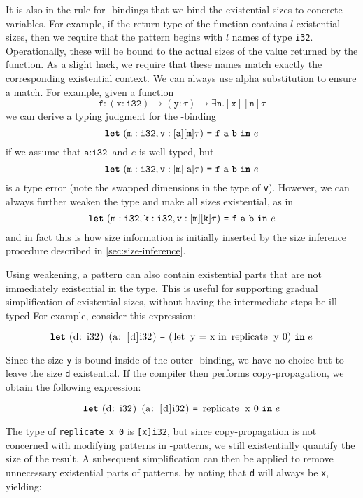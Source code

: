 It is also in the rule for -bindings that we bind the
existential sizes to concrete variables.  For example, if the return
type of the function contains $l$ existential sizes, then we require
that the pattern begins with $l$ names of type \texttt{i32}.
Operationally, these will be bound to the actual sizes of the value
returned by the function.  As a slight hack, we require that these
names match exactly the corresponding existential context.  We can
always use alpha substitution to ensure a match.  For example, given a
function
\[
  \texttt{f}: (\texttt{x}: \texttt{i32}) \rightarrow (\texttt{y}: \tau) \rightarrow \exists \texttt{n}.[\texttt{x}][\texttt{n}]\tau
\]
we can derive a typing judgment for the -binding
\[
\mbox{\texttt{\bfseries{let}}}~(\texttt{m}: \texttt{i32}, \texttt{v}: [\texttt{a}][\texttt{m}]\tau)~\mbox{\texttt{=}}~\texttt{f}~\texttt{a}~\texttt{b}~\mbox{\texttt{\bfseries{in}}}~e
\]
if we assume that $\texttt{a}: \texttt{i32}$ and $e$ is well-typed,
but
\[
\mbox{\texttt{\bfseries{let}}}~(\texttt{m}: \texttt{i32}, \texttt{v}: [\texttt{m}][\texttt{a}]\tau)~\mbox{\texttt{=}}~\texttt{f}~\texttt{a}~\texttt{b}~\mbox{\texttt{\bfseries{in}}}~e
\]
is a type error (note the swapped dimensions in the type of
\texttt{v}).  However, we can always further weaken the type and make
all sizes existential, as in
\[
\mbox{\texttt{\bfseries{let}}}~(\texttt{m}: \texttt{i32}, \texttt{k}: \texttt{i32}, \texttt{v}: [\texttt{m}][\texttt{k}]\tau)~\mbox{\texttt{=}}~\texttt{f}~\texttt{a}~\texttt{b}~\mbox{\texttt{\bfseries{in}}}~e
\]
and in fact this is how size information is initially inserted by the
size inference procedure described in \cref{sec:size-inference}.

Using weakening, a pattern can also contain existential parts that are
not immediately existential in the type.  This is useful for
supporting gradual simplification of existential sizes, without having
the intermediate steps be ill-typed For example, consider this
expression:

\[
\Let{\mbox{\lstinline{(d: i32) (a: [d]i32)}}}{\mbox{\lstinline{(let y = x in replicate y 0)}}}{e}
\]

Since the size \texttt{y} is bound inside of the outer
-binding, we have no choice but to leave the size \texttt{d}
existential.  If the compiler then performs copy-propagation, we
obtain the following expression:

\[
\Let{\mbox{\lstinline{(d: i32) (a: [d]i32)}}}{\mbox{\lstinline{replicate x 0}}}{e}
\]

The type of \lstinline{replicate x 0} is \lstinline{[x]i32}, but since
copy-propagation is not concerned with modifying patterns in
-patterns, we still existentially quantify the size of the
result.  A subsequent simplification can then be applied to remove
unnecessary existential parts of patterns, by noting that \texttt{d}
will always be \texttt{x}, yielding:


